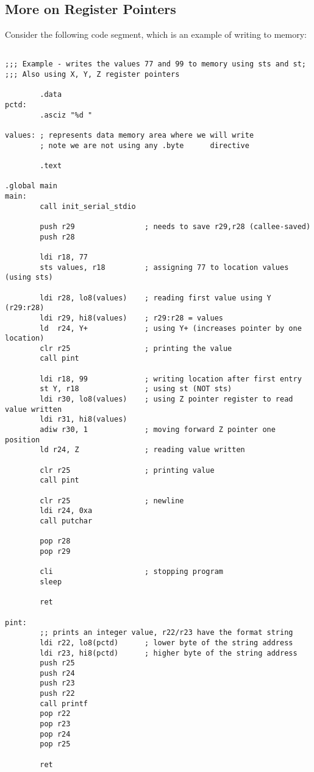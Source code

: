 \subsection{More on Register Pointers}
Consider the following code segment, which is an example of writing to memory:


\lstset{
caption=Assembly: Register Pointers
}
\begin{lstlisting}

;;; Example - writes the values 77 and 99 to memory using sts and st; 
;;; Also using X, Y, Z register pointers

        .data
pctd:
        .asciz "%d "

values: ; represents data memory area where we will write
        ; note we are not using any .byte      directive

        .text

.global main
main:
        call init_serial_stdio

        push r29                ; needs to save r29,r28 (callee-saved)
        push r28

        ldi r18, 77
        sts values, r18         ; assigning 77 to location values (using sts)

        ldi r28, lo8(values)    ; reading first value using Y (r29:r28)
        ldi r29, hi8(values)    ; r29:r28 = values
        ld  r24, Y+             ; using Y+ (increases pointer by one location)
        clr r25                 ; printing the value
        call pint

        ldi r18, 99             ; writing location after first entry
        st Y, r18               ; using st (NOT sts)
        ldi r30, lo8(values)    ; using Z pointer register to read value written
        ldi r31, hi8(values)    
        adiw r30, 1             ; moving forward Z pointer one position
        ld r24, Z               ; reading value written

        clr r25                 ; printing value
        call pint

        clr r25                 ; newline
        ldi r24, 0xa
        call putchar

        pop r28
        pop r29

        cli                     ; stopping program
        sleep

        ret

pint:
        ;; prints an integer value, r22/r23 have the format string
        ldi r22, lo8(pctd)      ; lower byte of the string address
        ldi r23, hi8(pctd)      ; higher byte of the string address
        push r25
        push r24
        push r23
        push r22
        call printf
        pop r22
        pop r23
        pop r24
        pop r25

        ret
\end{lstlisting}


